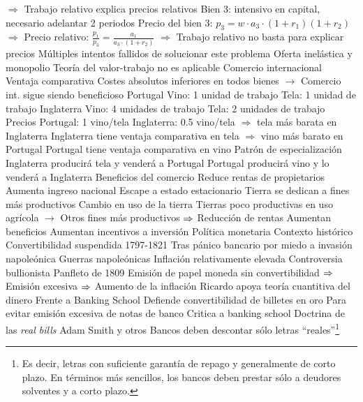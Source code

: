 \documentclass{nuevotema}
\begin{document}
\begin{esquemal}
				\4[] $\Rightarrow$ Trabajo relativo explica precios relativos
				\4[] Bien 3: intensivo en capital, necesario adelantar 2 periodos
				\4[] Precio del bien 3: $p_3 = w \cdot a_3 \cdot (1+r_1)(1+r_2)$
				\4[] $\Rightarrow$ Precio relativo: $\frac{p_1}{p_3} = \frac{a_1}{a_3\cdot (1+r_2)}$
				\4[] $\Rightarrow$ Trabajo relativo no basta para explicar precios
				\4 Múltiples intentos fallidos de solucionar este problema
			\3 Oferta inelástica y monopolio
				\4 Teoría del valor-trabajo no es aplicable
		\2 Comercio internacional
			\3 Ventaja comparativa
				\4 Costes absolutos inferiores en todos bienes
				\4[] $\to$ Comercio int. sigue siendo beneficioso
				\4 Portugal
				\4[] Vino: 1 unidad de trabajo
				\4[] Tela: 1 unidad de trabajo
				\4 Inglaterra
				\4[] Vino: 4 unidades de trabajo
				\4[] Tela: 2 unidades de trabajo
				\4 Precios
				\4[] Portugal: 1 vino/tela
				\4[] Inglaterra: 0.5 vino/tela
				\4[] $\Rightarrow$ tela más barata en Inglaterra
				\4[] Inglaterra tiene ventaja comparativa en tela
				\4[] $\Rightarrow$ vino más barato en Portugal
				\4[] Portugal tiene ventaja comparativa en vino
			\3 Patrón de especialización
				\4 Inglaterra producirá tela y venderá a Portugal
				\4 Portugal producirá vino y lo venderá a Inglaterra
			\3 Beneficios del comercio
				\4 Reduce rentas de propietarios
				\4 Aumenta ingreso nacional
			\3 Escape a estado estacionario
				\4 Tierra se dedican a fines más productivos
				\4 Cambio en uso de la tierra
				\4[] Tierras poco productivas en uso agrícola
				\4[] $\to$ Otros fines más productivos
				\4[] $\Rightarrow$ Reducción de rentas
				\4 Aumentan beneficios
				\4[] Aumentan incentivos a inversión
		\2 Política monetaria
			\3 Contexto histórico
				\4 Convertibilidad suspendida 1797-1821
				\4[] Tras pánico bancario por miedo a invasión napoleónica
				\4 Guerras napoleónicas
				\4 Inflación relativamente elevada
			\3 Controversia bullionista
				\4 Panfleto de 1809
				\4 Emisión de papel moneda sin convertibilidad
				\4[] $\Rightarrow$ Emisión excesiva
				\4[] $\Rightarrow$ Aumento de la inflación
				\4 Ricardo apoya teoría cuantitiva del dinero
				\4[] Frente a Banking School
				\4 Defiende convertibilidad de billetes en oro
				\4[] Para evitar emisión excesiva de notas de banco
			\3 Critica a banking school
				\4 Doctrina de las \textit{real bills}
				\4[]  Adam Smith y otros
				\4[]  Bancos deben descontar sólo letras ``reales''\footnote{Es decir, letras con suficiente garantía de repago y generalmente de corto plazo. En términos más sencillos, los bancos deben prestar sólo a deudores solventes y a corto plazo.}

\end{esquemal}
\end{document}

